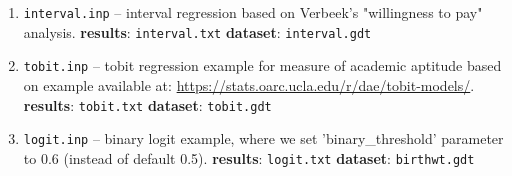 \begin{enumerate}
		This example closely replicates results published
		in \cite{econometrics8020021}.\newline
		\textbf{results}: \texttt{UKM1.txt}\newline
		\textbf{dataset}: \texttt{UKM1.gdt}
	\item \texttt{interval.inp} -- interval regression
		based on Verbeek's "willingness to pay" analysis.\newline
		\textbf{results}: \texttt{interval.txt}\newline
		\textbf{dataset}: \texttt{interval.gdt}
	\item \texttt{tobit.inp} -- tobit regression example
		for measure of academic aptitude based on example
		available at: \url{https://stats.oarc.ucla.edu/r/dae/tobit-models/}.\newline
		\textbf{results}: \texttt{tobit.txt}\newline
		\textbf{dataset}: \texttt{tobit.gdt}
	\item \texttt{logit.inp} -- binary logit example,
		where we set 'binary\_threshold' parameter to 0.6
		(instead of default 0.5).\newline
		\textbf{results}: \texttt{logit.txt}\newline
		\textbf{dataset}: \texttt{birthwt.gdt}
\end{enumerate}
